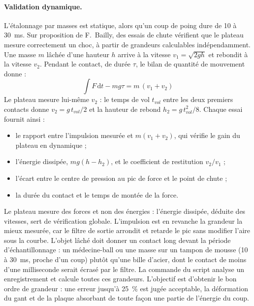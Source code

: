 \paragraph{Validation dynamique.} L'étalonnage par masses est statique, alors qu'un coup de poing dure de 10 à 30~ms. Sur proposition de F.~Bailly, des essais de chute vérifient que le plateau mesure correctement un choc, à partir de grandeurs calculables indépendamment. Une masse $m$ lâchée d'une hauteur $h$ arrive à la vitesse $v_1 = \sqrt{2gh}$ et rebondit à la vitesse $v_2$. Pendant le contact, de durée $\tau$, le bilan de quantité de mouvement donne :
\begin{equation}
\int F\,\mathrm{d}t - m g \tau = m\,(v_1 + v_2)
\end{equation}
Le plateau mesure lui-même $v_2$ : le temps de vol $t_{vol}$ entre les deux premiers contacts donne $v_2 = g\,t_{vol}/2$ et la hauteur de rebond $h_2 = g\,t_{vol}^2/8$. Chaque essai fournit ainsi :
\begin{itemize}
  \item le rapport entre l'impulsion mesurée et $m(v_1+v_2)$, qui vérifie le gain du plateau en dynamique ;
  \item l'énergie dissipée, $m g (h - h_2)$, et le coefficient de restitution $v_2/v_1$ ;
  \item l'écart entre le centre de pression au pic de force et le point de chute ;
  \item la durée du contact et le temps de montée de la force.
\end{itemize}
Le plateau mesure des forces et non des énergies : l'énergie dissipée, déduite des vitesses, sert de vérification globale. L'impulsion est en revanche la grandeur la mieux mesurée, car le filtre de sortie arrondit et retarde le pic sans modifier l'aire sous la courbe. L'objet lâché doit donner un contact long devant la période d'échantillonnage : un médecine-ball ou une masse sur un tampon de mousse (10 à 30~ms, proche d'un coup) plutôt qu'une bille d'acier, dont le contact de moins d'une milliseconde serait écrasé par le filtre. La commande  du script analyse un enregistrement et calcule toutes ces grandeurs. L'objectif est d'obtenir le bon ordre de grandeur : une erreur jusqu'à 25~\% est jugée acceptable, la déformation du gant et de la plaque absorbant de toute façon une partie de l'énergie du coup.
